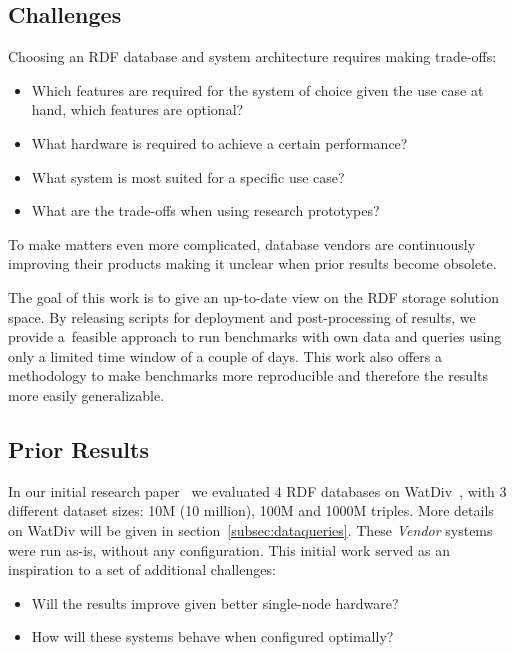 \subsection{Challenges}
Choosing an RDF database and system architecture requires making trade-offs: 

\begin{itemize}
	\item Which features are required for the system of choice given the use case at hand, which features are optional?
	\item What hardware is required to achieve a certain performance?
	\item What system is most suited for a specific use case?
	\item What are the trade-offs when using research prototypes? 
\end{itemize}

To make matters even more complicated, database vendors are continuously improving their products making it unclear when prior results become obsolete.

The goal of this work is to give an up-to-date view on the RDF storage solution space.
By releasing scripts for deployment and post-processing of results, we provide a~feasible approach to run benchmarks with own data and queries using only a limited time window of a couple of days.
This work also offers a methodology to make benchmarks more reproducible and therefore the results more easily generalizable.

\subsection{Prior Results}
In our initial research paper~\cite{de2016big} we evaluated 4 RDF databases on WatDiv~\cite{alucc2014diversified}, with 3 different dataset sizes: 10M (10 million), 100M and 1000M triples. More details on WatDiv will be given in section~\ref{subsec:dataqueries}. These \emph{Vendor} systems were run as-is, without any configuration. 
This initial work served as an inspiration to a set of additional challenges:

\begin{itemize}
\item Will the results improve given better single-node hardware?
\item How will these systems behave when configured optimally?
\end{itemize}

